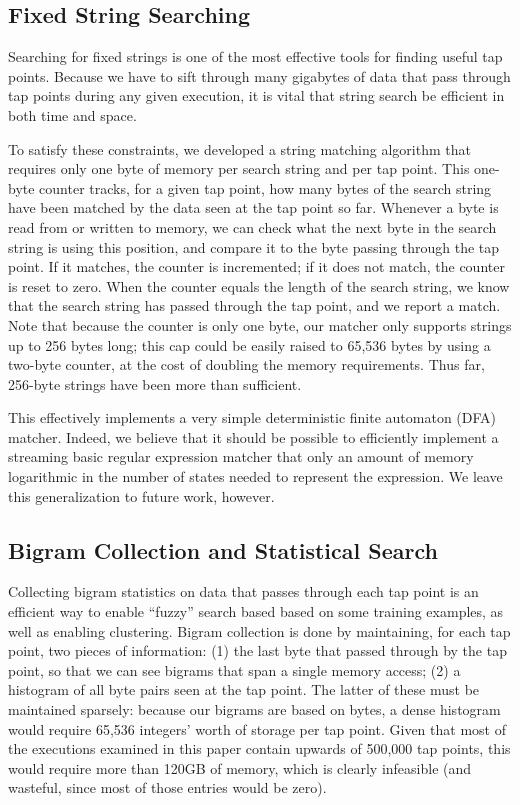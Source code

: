 \subsection{Fixed String Searching}
\label{sec:implementation:subsec:stringsearch}

Searching for fixed strings is one of the most effective tools for
finding useful tap points. Because we have to sift through many
gigabytes of data that pass through tap points during any given
execution, it is vital that string search be efficient in both time and
space.

To satisfy these constraints, we developed a string matching algorithm
that requires only one byte of memory per search string and per tap
point. This one-byte counter tracks, for a given tap point, how many
bytes of the search string have been matched by the data seen at the tap
point so far. Whenever a byte is read from or written to memory, we can
check what the next byte in the search string is using this position,
and compare it to the byte passing through the tap point. If it matches,
the counter is incremented; if it does not match, the counter is reset
to zero. When the counter equals the length of the search string, we
know that the search string has passed through the tap point, and we
report a match. Note that because the counter is only one byte, our
matcher only supports strings up to 256 bytes long; this cap could be
easily raised to 65,536 bytes by using a two-byte counter, at the cost
of doubling the memory requirements. Thus far, 256-byte strings have
been more than sufficient.

This effectively implements a very simple deterministic finite automaton
(DFA) matcher. Indeed, we believe that it should be possible to
efficiently implement a streaming basic regular expression matcher that
only an amount of memory logarithmic in the number of states needed to
represent the expression. We leave this generalization to future work,
however.

\subsection{Bigram Collection and Statistical Search}
\label{sec:implementation:subsec:stringsearch}

Collecting bigram statistics on data that passes through each tap point
is an efficient way to enable ``fuzzy'' search based based on some
training examples, as well as enabling clustering. Bigram collection is
done by maintaining, for each tap point, two pieces of information: (1)
the last byte that passed through by the tap point, so that we can see
bigrams that span a single memory access; (2) a histogram of all byte
pairs seen at the tap point. The latter of these must be maintained
sparsely: because our bigrams are based on bytes, a dense histogram
would require 65,536 integers' worth of storage per tap point. Given
that most of the executions examined in this paper contain upwards of
500,000 tap points, this would require more than 120GB of memory, which
is clearly infeasible (and wasteful, since most of those entries would
be zero).

